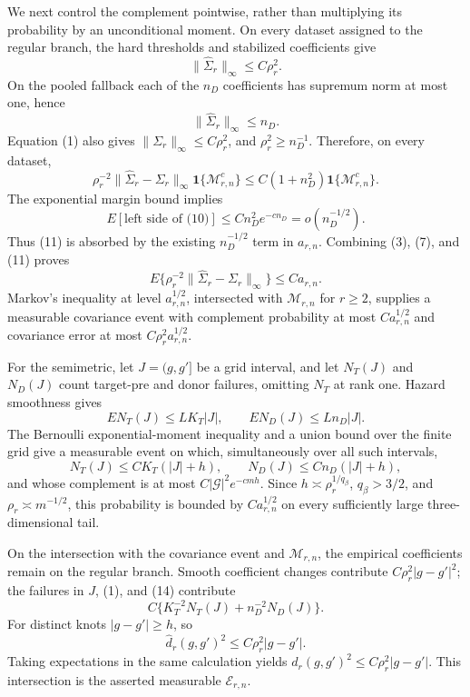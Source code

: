 We next control the complement pointwise, rather than multiplying its probability by an unconditional moment.  On every dataset assigned to the regular branch, the hard thresholds and stabilized coefficients give
\[
 \|\widehat\Sigma_r\|_\infty\le C\rho_r^2.            \tag{8}
\]
On the pooled fallback each of the \(n_D\) coefficients has supremum norm at most one, hence
\[
 \|\widehat\Sigma_r\|_\infty\le n_D.                  \tag{9}
\]
Equation (1) also gives \(\|\Sigma_r\|_\infty\le C\rho_r^2\), and \(\rho_r^2\ge n_D^{-1}\).  Therefore, on every dataset,
\[
 \rho_r^{-2}\|\widehat\Sigma_r-\Sigma_r\|_\infty
 \mathbf1\{\mathcal M_{r,n}^c\}
 \le C(1+n_D^2)\mathbf1\{\mathcal M_{r,n}^c\}.        \tag{10}
\]
The exponential margin bound implies
\[
 E[\text{left side of (10)}]
 \le Cn_D^2e^{-cn_D}=o(n_D^{-1/2}).                    \tag{11}
\]
Thus (11) is absorbed by the existing \(n_D^{-1/2}\) term in \(a_{r,n}\).  Combining (3), (7), and (11) proves
\[
 E\{\rho_r^{-2}\|\widehat\Sigma_r-\Sigma_r\|_\infty\}
 \le Ca_{r,n}.                                          \tag{12}
\]
Markov's inequality at level \(a_{r,n}^{1/2}\), intersected with \(\mathcal M_{r,n}\) for \(r\ge2\), supplies a measurable covariance event with complement probability at most \(Ca_{r,n}^{1/2}\) and covariance error at most \(C\rho_r^2a_{r,n}^{1/2}\).

For the semimetric, let \(J=(g,g']\) be a grid interval, and let \(N_T(J)\) and \(N_D(J)\) count target-pre and donor failures, omitting \(N_T\) at rank one.  Hazard smoothness gives
\[
 EN_T(J)\le LK_T|J|,
 \qquad EN_D(J)\le Ln_D|J|.                             \tag{13}
\]
The Bernoulli exponential-moment inequality and a union bound over the finite grid give a measurable event on which, simultaneously over all such intervals,
\[
 N_T(J)\le CK_T(|J|+h),
 \qquad N_D(J)\le Cn_D(|J|+h),                           \tag{14}
\]
and whose complement is at most \(C|\mathcal G|^2e^{-cmh}\).  Since \(h\asymp\rho_r^{1/q_\beta}\), \(q_\beta>3/2\), and \(\rho_r\asymp m^{-1/2}\), this probability is bounded by \(Ca_{r,n}^{1/2}\) on every sufficiently large three-dimensional tail.

On the intersection with the covariance event and \(\mathcal M_{r,n}\), the empirical coefficients remain on the regular branch.  Smooth coefficient changes contribute \(C\rho_r^2|g-g'|^2\); the failures in \(J\), (1), and (14) contribute
\[
 C\{K_T^{-2}N_T(J)+n_D^{-2}N_D(J)\}.
\]
For distinct knots \(|g-g'|\ge h\), so
\[
 \widehat d_r(g,g')^2\le C\rho_r^2|g-g'|.              \tag{15}
\]
Taking expectations in the same calculation yields \(d_r(g,g')^2\le C\rho_r^2|g-g'|\).  This intersection is the asserted measurable \(\mathcal E_{r,n}\).

